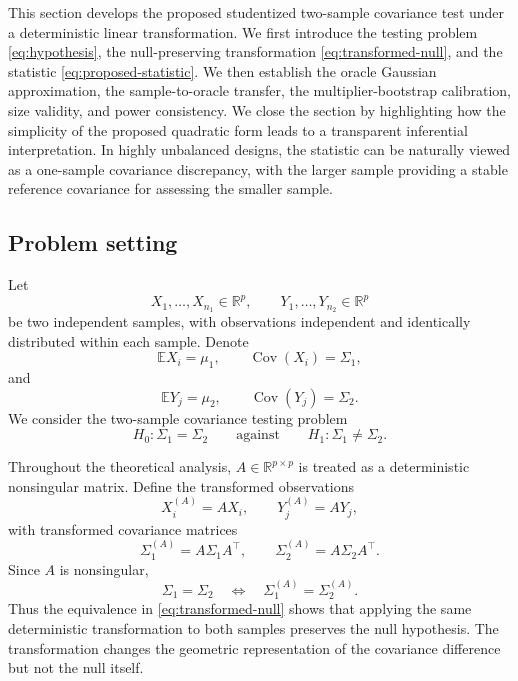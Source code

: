 \documentclass[
  12pt]{article}
\theoremstyle{plain}
\theoremstyle{definition}
\theoremstyle{remark}
\begin{document}
This section develops the proposed studentized two-sample covariance test under
a deterministic linear transformation.  We first introduce the testing problem
\eqref{eq:hypothesis}, the null-preserving transformation
\eqref{eq:transformed-null}, and the statistic \eqref{eq:proposed-statistic}.
We then establish the oracle Gaussian approximation, the sample-to-oracle
transfer, the multiplier-bootstrap calibration, size validity, and power
consistency.  We close the section by highlighting how the simplicity of 
the proposed quadratic form leads to a transparent 
inferential interpretation. In highly unbalanced designs, 
the statistic can be naturally viewed as a one-sample covariance 
discrepancy, with the larger sample providing 
a stable reference covariance for assessing the smaller sample.


\subsection{Problem setting}
\label{subsec:problem_setting}

Let
\[
X_1,\ldots,X_{n_1}\in\mathbb R^p,
\qquad
Y_1,\ldots,Y_{n_2}\in\mathbb R^p
\]
be two independent samples, with observations independent and identically
distributed within each sample.  Denote
\[
\mathbb E X_i=\mu_1,\qquad \operatorname{Cov}(X_i)=\Sigma_1,
\]
and
\[
\mathbb E Y_j=\mu_2,\qquad \operatorname{Cov}(Y_j)=\Sigma_2.
\]
We consider the two-sample covariance testing problem
\begin{equation}
\label{eq:hypothesis}
H_0:\Sigma_1=\Sigma_2
\qquad\text{against}\qquad
H_1:\Sigma_1\neq\Sigma_2.
\end{equation}

Throughout the theoretical analysis, \(A\in\mathbb R^{p\times p}\) is treated
as a deterministic nonsingular matrix.  Define the transformed observations
\[
X_i^{(A)}=AX_i,\qquad Y_j^{(A)}=AY_j,
\]
with transformed covariance matrices
\[
\Sigma_1^{(A)}=A\Sigma_1A^\top,
\qquad
\Sigma_2^{(A)}=A\Sigma_2A^\top.
\]
Since \(A\) is nonsingular,
\begin{equation}
\label{eq:transformed-null}
\Sigma_1=\Sigma_2
\quad\Longleftrightarrow\quad
\Sigma_1^{(A)}=\Sigma_2^{(A)}.
\end{equation}
Thus the equivalence in \eqref{eq:transformed-null} shows that applying the
same deterministic transformation to both samples preserves the null
hypothesis.  The transformation changes the geometric representation of the
covariance difference but not the null itself.
\end{document}
